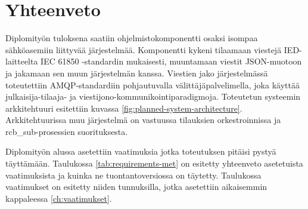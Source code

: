 \chapter{Yhteenveto}
\label{ch:yhteenveto}
Diplomityön tuloksena saatiin ohjelmistokomponentti osaksi isompaa sähköasemiin liittyvää järjestelmää. Komponentti kykeni tilaamaan viestejä IED-laitteelta IEC 61850 -stan\-dar\-din mukaisesti, muuntamaan viestit JSON-muotoon ja jakamaan sen muun järjestelmän kanssa. Viestien jako järjestelmässä toteutettiin AMQP-standardiin pohjautuvalla välittäjäpalvelimella, joka käyttää julkaisija-tilaaja- ja viestijono-kom\-mu\-ni\-koin\-ti\-pa\-ra\-dig\-mo\-ja. Toteutetun systeemin arkkitehtuuri esitettiin kuvassa \ref{fig:planned-system-architecture}. Arkkitehtuurissa muu järjestelmä on vastuussa tilauksien orkestroinnissa ja rcb\_sub-prosessien suorituksesta.

Diplomityön alussa asetettiin vaatimuksia jotka toteutuksen pitäisi pystyä täyttämään. Taulukossa \ref{tab:requirements-met} on esitetty yhteenveto asetetuista vaatimuksista ja kuinka ne tuontantoversiossa on täytetty. Taulukossa vaatimukset on esitetty niiden tunnuksilla, jotka asetettiin aikaisemmin kappaleessa \ref{ch:vaatimukset}.

